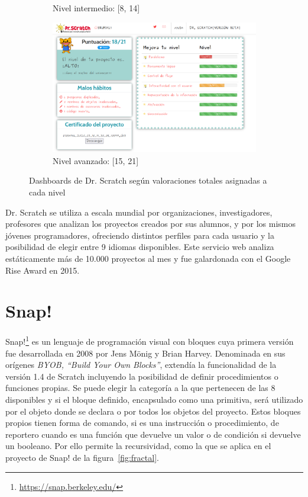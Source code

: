 \documentclass[a4paper, 12pt]{book}
\begin{document}
\begin{figure}[H]
\begin{subfigure}[h]{.325\textwidth}
        \caption{Nivel intermedio: [8, 14]}
    \end{subfigure}
    \begin{subfigure}[h]{.325\textwidth} 
        \includegraphics[width=\textwidth]{img/alto_Scratch}
        \caption{Nivel avanzado: [15, 21]}
    \end{subfigure}
    \caption{Dashboards de Dr. Scratch según valoraciones totales asignadas a cada nivel}
    \label{fig:dashboards}
\end{figure}

Dr. Scratch se utiliza a escala mundial por organizaciones, investigadores, profesores que analizan los proyectos creados por sus alumnos, y por los mismos jóvenes programadores, ofreciendo distintos perfiles para cada usuario y la posibilidad de elegir entre 9 idiomas disponibles. Este servicio web analiza estáticamente más de 10.000 proyectos al mes y fue galardonada con el Google Rise Award en 2015. %

\section{Snap!}
\label{sec:snap}

Snap!\footnote{\url{https://snap.berkeley.edu/}} es un lenguaje de programación visual con bloques cuya primera versión fue desarrollada en 2008 por Jens Mönig y Brian Harvey. Denominada en sus orígenes \emph{BYOB, ``Build Your Own Blocks''}, extendía la funcionalidad de la versión 1.4 de Scratch incluyendo la posibilidad de definir procedimientos o funciones propias. Se puede elegir la categoría a la que pertenecen de las 8 disponibles y si el bloque definido, encapsulado como una primitiva, será utilizado por el objeto donde se declara o por todos los objetos del proyecto.
Estos bloques propios tienen forma de comando, si es una instrucción o procedimiento, de reportero cuando es una función que devuelve un valor o de condición si devuelve un booleano. Por ello permite la recursividad, como la que se aplica en el proyecto de Snap! de la figura~\ref{fig:fractal}.
\end{document}
